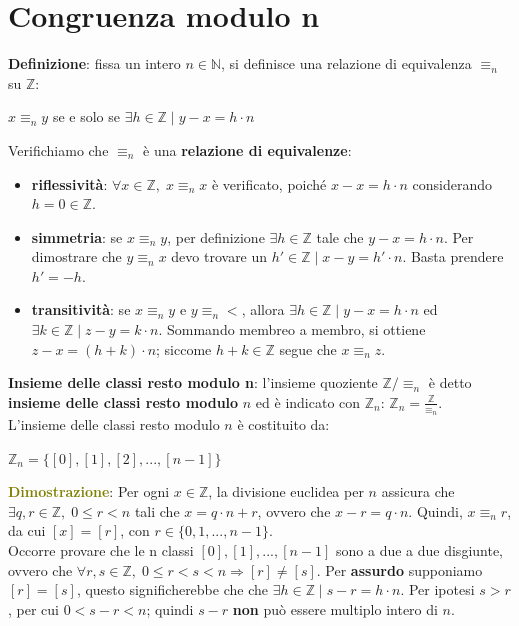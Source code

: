 \newpage
\section{Congruenza modulo n}
\textbf{Definizione}: fissa un intero $n \in \mathbb{N}$, si definisce una relazione di equivalenza $\equiv_n$ su $\mathbb{Z}$:
\begin{center}
    $x \equiv_n y$ se e solo se $\exists h \in \mathbb{Z} \; | \; y - x = h \cdot n$
\end{center}
Verifichiamo che $\equiv_n$ è una \textbf{relazione di equivalenze}:
\begin{itemize}[nosep]
    \item \textbf{riflessività}: $\forall x \in \mathbb{Z}, \; x \equiv_n x$ è verificato, poiché $x - x = h \cdot n$ considerando $h = 0 \in \mathbb{Z}$.
    \item \textbf{simmetria}: se $x \equiv_n y$, per definizione $\exists h \in \mathbb{Z}$ tale che $y - x = h \cdot n$. Per dimostrare che $y \equiv_n x$ devo trovare un $h' \in \mathbb{Z} \; | \; x-y = h' \cdot n$. Basta prendere $h'=-h$.
    \item \textbf{transitività}: se $x \equiv_n y$ e $y \equiv_n <$, allora $\exists h \in \mathbb{Z} \; | \; y - x = h \cdot n$ ed $\exists k \in \mathbb{Z} \; | \; z - y = k \cdot n$. Sommando membreo a membro, si ottiene $z - x = (h + k) \cdot n$; siccome $h + k \in \mathbb{Z}$ segue che $x \equiv_n z$.
\end{itemize}
\textbf{Insieme delle classi resto modulo n}: l'insieme quoziente $\mathbb{Z}/ \equiv_n$ è detto \textbf{insieme delle classi resto modulo} $n$ ed è indicato con $\mathbb{Z}_n$: $\mathbb{Z}_n = \frac{\mathbb{Z}}{\equiv_n}$. \\
L'insieme delle classi resto modulo $n$ è costituito da: 
\begin{center}
    $\mathbb{Z}_n = \{[0], [1], [2], ..., [n-1]\}$
\end{center}
\textcolor{olive}{\textbf{Dimostrazione}}: Per ogni $x \in \mathbb{Z}$, la divisione euclidea per $n$ assicura che $\exists q,r \in \mathbb{Z}, \; 0 \leq r < n$ tali che $x = q \cdot n + r$, ovvero che $x - r = q \cdot n$. Quindi, $x \equiv_n r$, da cui $[x] = [r]$, con $r \in \{0,1,..., n-1\}$. \\
Occorre provare che le n classi $[0], [1], ..., [n-1]$ sono a due a due disgiunte, ovvero che $\forall r,s \in \mathbb{Z}, \; 0 \leq r < s < n \Rightarrow [r] \neq [s]$. Per \textbf{assurdo} supponiamo $[r] = [s]$, questo significherebbe che che $\exists h \in \mathbb{Z} \; | \; s - r = h \cdot n$. Per ipotesi $s > r$, per cui $0 < s - r < n$; quindi $s - r$ \textbf{non} può essere multiplo intero di $n$.

